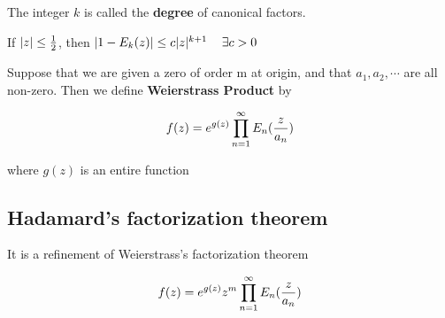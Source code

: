 \documentclass[11pt]{article}
\makeatletter
\newcommand{\boxspacing}{\kern\kvtcb@left@rule\kern\kvtcb@boxsep}
\newcommand{\prompt}[4]{
        {\ttfamily\llap{{\color{#2}[#3]:\hspace{3pt}#4}}\vspace{-\baselineskip}}
    }
\makeatother
\begin{document}
The integer \(k\) is called the \textbf{degree} of canonical factors.

If \(\large|z|\le\frac{1}{2}\), then
\(\large|1-E_{k}(z)| \le c|z|^{k+1}\quad \exists c>0\)

Suppose that we are given a zero of order m at origin, and that
\(a_{1},a_{2},\cdots\) are all non-zero. Then we define
\textbf{Weierstrass Product} by

\[\Huge f(z)=e^{g(z)}\prod_{n=1}^{\infty}E_{n}(\frac{z}{a_{n}})\]

where \(g(z)\) is an entire function

    \subsection{Hadamard's factorization
theorem}\label{hadamards-factorization-theorem}

It is a refinement of Weierstrass's factorization theorem

\[\Huge f(z)=e^{g(z)}z^{m}\prod_{n=1}^{\infty}E_{n}(\frac{z}{a_{n}})\]

    \begin{tcolorbox}[breakable, size=fbox, boxrule=1pt, pad at break*=1mm,colback=cellbackground, colframe=cellborder]
\prompt{In}{incolor}{ }{\boxspacing}
\begin{Verbatim}[commandchars=\\\{\}]

\end{Verbatim}
\end{tcolorbox}

    \begin{tcolorbox}[breakable, size=fbox, boxrule=1pt, pad at break*=1mm,colback=cellbackground, colframe=cellborder]
\prompt{In}{incolor}{ }{\boxspacing}
\begin{Verbatim}[commandchars=\\\{\}]

\end{Verbatim}
\end{tcolorbox}


    
    
    
\end{document}

